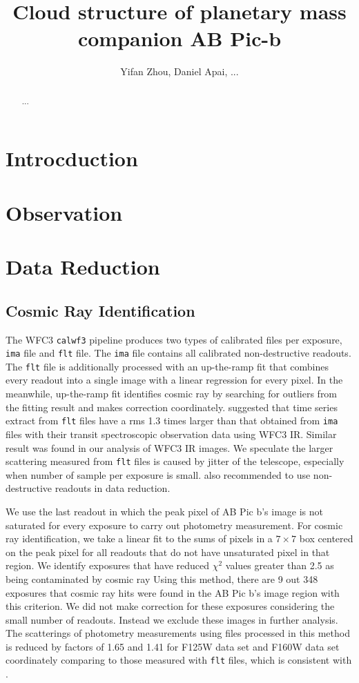 \documentclass[apj]{emulateapj}
\newcommand{\ima}{\texttt{ima} file}
\newcommand{\flt}{\texttt{flt} file}
\begin{document}
\title{Cloud structure of planetary mass companion AB Pic-b}
\author{Yifan Zhou, Daniel Apai, ...}

\begin{abstract}
...
\end{abstract}

\maketitle
\section{Introcduction}

\section{Observation}
\section{Data Reduction}

\subsection{Cosmic Ray Identification}
The WFC3 \texttt{calwf3} pipeline produces two types of calibrated
files per exposure, \ima{} and \flt.  The \ima{} contains all
calibrated non-destructive readouts. The \flt{} is additionally
processed with an up-the-ramp fit that combines every readout into a
single image with a linear regression for every pixel. In the
meanwhile, up-the-ramp fit identifies cosmic ray by searching for
outliers from the fitting result and makes correction
coordinately. \citeauthor{Mandell2013} suggested that time series
extract from {\flt}s have a rms 1.3 times larger than that obtained
from {\ima}s with their transit spectroscopic observation data using
WFC3 IR. Similar result was found in our analysis of WFC3 IR
images. We speculate the larger scattering measured from {\flt}s is
caused by jitter of the telescope, especially when number of sample
per exposure is small. \citeauthor{Swain2013} also recommended to use
non-destructive readouts in data reduction.

We use the last readout in which the peak pixel of AB Pic b's image is
not saturated for every exposure to carry out photometry
measurement. For cosmic ray identification, we take a linear fit to
the sums of pixels in a $7\times7$ box centered on the peak pixel for
all readouts that do not have unsaturated pixel in that region. We
identify exposures that have reduced $\chi^{2}$ values greater than
2.5 as being contaminated by cosmic ray Using this method, there are 9
out 348 exposures that cosmic ray hits were found in the AB Pic b's
image region with this criterion. We did not make correction for these
exposures considering the small number of readouts. Instead we exclude
these images in further analysis. The scatterings of photometry
measurements using files processed in this method is reduced by
factors of 1.65 and 1.41 for F125W data set and F160W data set
coordinately comparing to those measured with {\flt}s, which is
consistent with \citet{Mandell2013}.
\end{document}
